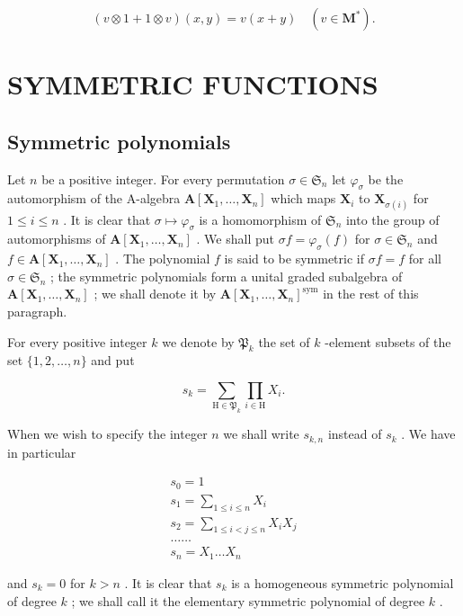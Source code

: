 \[
(v \otimes 1 + 1 \otimes v) (x, y) = v (x + y) \quad (v \in \mathbf {M} ^ {*}).
\]

\section{SYMMETRIC FUNCTIONS}

\subsection{Symmetric polynomials}

Let \(n\) be a positive integer. For every permutation \(\sigma \in \mathfrak{S}_n\) let \(\varphi_{\sigma}\) be the automorphism of the A-algebra \(\mathbf{A}[\mathbf{X}_1, \ldots, \mathbf{X}_n]\) which maps \(\mathbf{X}_i\) to \(\mathbf{X}_{\sigma(i)}\) for \(1 \leqslant i \leqslant n\) . It is clear that \(\sigma \mapsto \varphi_{\sigma}\) is a homomorphism of \(\mathfrak{S}_n\) into the group of automorphisms of \(\mathbf{A}[\mathbf{X}_1, \ldots, \mathbf{X}_n]\) . We shall put \(\sigma f = \varphi_{\sigma}(f)\) for \(\sigma \in \mathfrak{S}_n\) and \(f \in \mathbf{A}[\mathbf{X}_1, \ldots, \mathbf{X}_n]\) . The polynomial \(f\) is said to be symmetric if \(\sigma f = f\) for all \(\sigma \in \mathfrak{S}_n\) ; the symmetric polynomials form a unital graded subalgebra of \(\mathbf{A}[\mathbf{X}_1, \ldots, \mathbf{X}_n]\) ; we shall denote it by \(\mathbf{A}[\mathbf{X}_1, \ldots, \mathbf{X}_n]^{\text{sym}}\) in the rest of this paragraph.

For every positive integer \(k\) we denote by \(\mathfrak{P}_k\) the set of \(k\) -element subsets of the set \(\{1, 2, \ldots, n\}\) and put

\[
s _ {k} = \sum_ {\mathrm{H} \in \mathfrak {P} _ {k}} \prod_ {i \in \mathrm{H}} X _ {i}.\tag{1}
\]

When we wish to specify the integer \(n\) we shall write \(s_{k,n}\) instead of \(s_k\) . We have in particular

\[
\begin{array}{l} s _ {0} = 1 \\ s _ {1} = \sum_ {1 \leqslant i \leqslant n} X _ {i} \\ s _ {2} = \sum_ {1 \leqslant i <   j \leqslant n} X _ {i} X _ {j} \\ \dots \dots \\ s _ {n} = X _ {1} \dots X _ {n} \end{array}
\]

and \(s_k = 0\) for \(k > n\) . It is clear that \(s_k\) is a homogeneous symmetric polynomial of degree \(k\) ; we shall call it the elementary symmetric polynomial of degree \(k\) .

